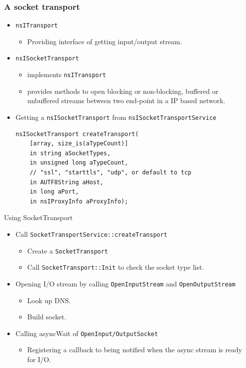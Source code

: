 \documentclass{beamer}
\begin{document}
\begin{frame}[fragile]
  \frametitle{A socket transport}
  \begin{itemize}
  \item \texttt{nsITransport}
    \begin{itemize}
    \item Providing interface of getting input/output stream.
    \end{itemize}
  \item \texttt{nsISocketTransport}
    \begin{itemize}
    \item implements \texttt{nsITransport}
    \item provides methods to open blocking or non-blocking, buffered or unbuffered streams between two end-point in a IP based network.
    \end{itemize}
  \item Getting a \texttt{nsISocketTransport} from \texttt{nsISocketTransportService}
    \begingroup
    \fontsize{8pt}{12pt}\selectfont
\begin{verbatim}
nsISocketTransport createTransport(
    [array, size_is(aTypeCount)]
    in string aSocketTypes,
    in unsigned long aTypeCount,
    // "ssl", "starttls", "udp", or default to tcp
    in AUTF8String aHost,
    in long aPort,
    in nsIProxyInfo aProxyInfo);
\end{verbatim}
\endgroup
  \end{itemize}
\end{frame}

\begin{frame}{Using SocketTransport}
  \begin{itemize}
  \item Call \texttt{SocketTransportService::createTransport}
    \begin{itemize}
    \item Create a \texttt{SocketTransport}
    \item Call \texttt{SocketTransport::Init} to check the socket type list.
    \end{itemize}
  \item Opening I/O stream by calling \texttt{OpenInputStream} and
    \texttt{OpenOutputStream}
    \begin{itemize}
    \item Look up DNS.
    \item Build socket.
    \end{itemize}
  \item Calling asyncWait of \texttt{OpenInput/OutputSocket}
    \begin{itemize}
    \item Registering a callback to being notified when the async stream is ready for I/O.
    \end{itemize}
  \end{itemize}
\end{frame}
\end{document}
